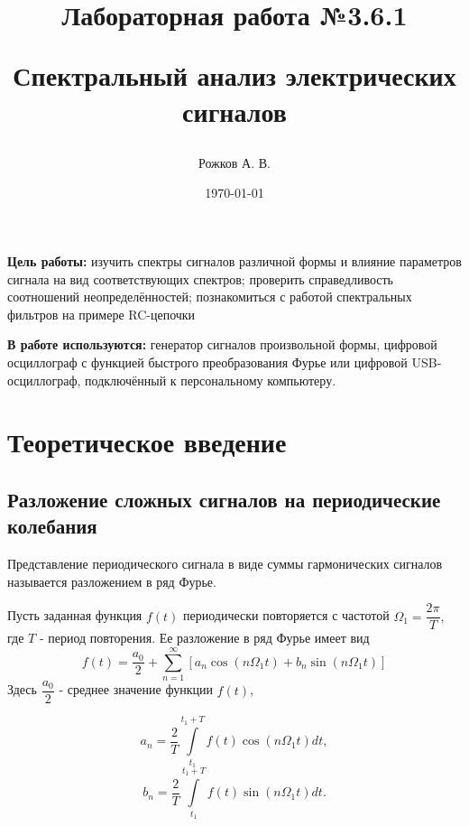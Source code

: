 \documentclass[a4paper, 12pt]{article}
\title{\begin{center}Лабораторная работа №3.6.1\end{center}
Спектральный анализ электрических сигналов}
\author{Рожков А. В.}
\date{\today}
\begin{document}
    \maketitle
    \newpage
    \renewcommand*{\thesubsection}{\thesection.\Alph{subsection}}

    \textbf{Цель работы:} изучить спектры сигналов различной формы и влияние параметров сигнала на вид соответствующих спектров; проверить справедливость соотношений неопределённостей; познакомиться с работой спектральных фильтров на примере RC-цепочки

    \textbf{В работе используются:} генератор сигналов произвольной формы, цифровой осциллограф с функцией быстрого преобразования Фурье или цифровой USB-осциллограф, подключённый к персональному компьютеру.

    \section{Теоретическое введение}

        \subsection{Разложение сложных сигналов на периодические колебания}
            Представление периодического сигнала в виде суммы гармонических сигналов называется разложением в ряд Фурье.

	        Пусть заданная функция $f(t)$ периодически повторяется с частотой $\Omega_{1}=\dfrac{2\pi}{T},$ где $T$ - период повторения. Ее разложение в ряд Фурье имеет вид
            \begin{equation}
                f(t)=\dfrac{a_{0}}{2}+ \sum\limits_{n=1}^\infty [a_{n}\cos(n \Omega_{1}t)+b_{n}\sin(n \Omega_{1} t) ]
                \label{eq1}
            \end{equation}
		    Здесь $\dfrac{a_{0}}{2}$ - среднее значение функции $f(t)$,

            \begin{equation}
                a_{n}=\dfrac{2}{T}\int\limits_{t_{1}}^{t_{1}+T}f(t)\cos(n \Omega_{1} t)dt,
                \label{eq2}
            \end{equation}
            \begin{equation}
                b_{n}=\dfrac{2}{T}\int\limits_{t_{1}}^{t_{1}+T}f(t)\sin(n \Omega_{1} t)dt.
                \label{eq3}
            \end{equation}
\end{document}
